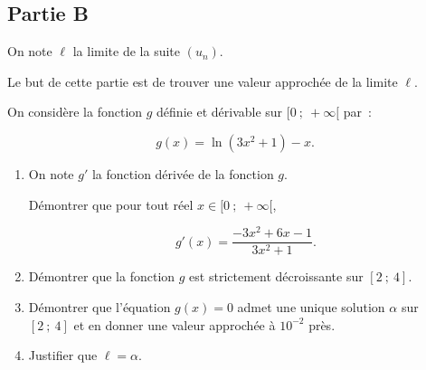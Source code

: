 \documentclass[10pt]{article}
\begin{document}
\subsection*{Partie B}

On note $\ell$ la limite de la suite $(u_n)$.

Le but de cette partie est de trouver une valeur approchée de la limite $\ell$.

On considère la fonction $g$ définie et dérivable sur $[0~;~+\infty[$ par~:

\[g(x) = \ln(3x^2+1) - x.\]

\begin{enumerate}
\item On note $g'$ la fonction dérivée de la fonction $g$.

Démontrer que pour tout réel $x \in [0~;~+\infty[$,

\[g'(x) = \dfrac{-3x^2 + 6x - 1}{3x^2 + 1}.\]

\item Démontrer que la fonction $g$ est strictement décroissante sur $[2~;~4]$.
\item Démontrer que l'équation $g(x) = 0$ admet une unique solution $\alpha$ sur $[2~;~4]$ et en donner une valeur approchée à $10^{-2}$ près.
\item Justifier que $\ell = \alpha$.
\end{enumerate}

\bigskip
\end{document}
